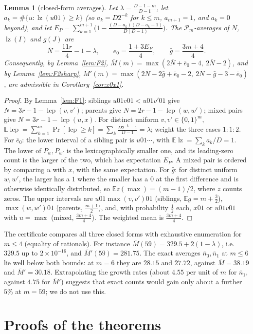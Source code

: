 \documentclass[11pt]{article}
\newtheorem{lemma}[theorem]{Lemma}
\theoremstyle{definition}
\theoremstyle{remark}
\newcommand{\E}{\mathbb{E}}
\newcommand{\lz}{\operatorname{lz}}
\newcommand{\lcp}{\operatorname{lcp}}
\begin{document}
\begin{lemma}[closed-form averages]\label{lem:avg}
Let $\lambda=\frac{D-1-m}{D-1}$, let $a_k=\#\{u:\lz(u01)\ge k\}$ (so $a_k=D2^{-k}$ for $k\le m$,
$a_{m+1}=1$, and $a_k=0$ beyond), and let
$E_P=\sum_{k=1}^{m+1}\bigl(1-\frac{(D-a_k)(D-a_k-1)}{D(D-1)}\bigr)$. The $\mathcal P_m$-averages of
$N$, $\lz(I)$ and $g(J)$ are
\[
 \bar N=\frac{11r}4-1-\lambda,\qquad \bar e_0=\frac{1+3E_P}4,\qquad \bar g=\frac{3m+4}4 .
\]
Consequently, by Lemma~\ref{lem:F2},
$\bar M(m)=\max(2\bar N+\bar e_0-4,\ 2\bar N-2)$, and by Lemma~\ref{lem:F2sharp},
$\bar M'(m)=\max(2\bar N-2\bar g+\bar e_0-2,\ 2\bar N-\bar g-3-\bar e_0)$, are admissible in
Corollary~\ref{cor:x0x1}.
\end{lemma}
\begin{proof}
By Lemma~\ref{lem:F1}: siblings $u01v01<u01v'01$ give $N=3r-1-\lcp(v,v')$; parents give
$N=2r-1-\lcp(w,w')$; mixed pairs give $N=3r-1-\lcp(u,x)$. For distinct uniform
$v,v'\in\{0,1\}^m$, $\E\lcp=\sum_{k=1}^m\Pr[\lcp\ge k]=\sum_k\frac{D2^{-k}-1}{D-1}=\lambda$; weight
the three cases $1:1:2$. For $\bar e_0$: the lower interval of a sibling pair is $u01\cdots$, with
$\E\lz=\sum_k a_k/D=1$. The lower of $P_w,P_{w'}$ is the lexicographically smaller one, and its
leading-zero count is the larger of the two, which has expectation $E_P$. A mixed pair is ordered
by comparing $u$ with $x$, with the same expectation. For $\bar g$: for distinct uniform
$w,w'$, the larger has a $1$ where the smaller has a $0$ at the first difference and is otherwise
identically distributed, so $\E z(\max)=(m-1)/2$, where $z$ counts zeros. The upper intervals are
$u01\max(v,v')01$ (siblings, $\E g=m+\frac32$), $\max(w,w')01$ (parents, $\frac{m+1}2$), and,
with probability $\frac12$ each, $x01$ or $u01v01$ with $u=\max$ (mixed, $\frac{3m+4}4$). The
weighted mean is $\frac{3m+4}4$.
\end{proof}

The certificate compares all three closed forms with exhaustive enumeration for $m\le4$ (equality
of rationals). For instance $\bar M(59)=329.5+2(1-\lambda)$, i.e.\ $329.5$ up to $2\times10^{-16}$, and
$\bar M'(59)=281.75$. The exact averages $\bar n_0,\bar n_1$ at $m\le6$ lie well below both
bounds: at $m=6$ they are $28.15$ and $27.72$, against $\bar M=38.19$ and $\bar M'=30.18$. Extrapolating the
growth rates (about $4.55$ per unit of $m$ for $\bar n_1$, against $4.75$ for $\bar M'$) suggests that
exact counts would gain only about a further $5\%$ at $m=59$; we do not use this.

\section{Proofs of the theorems}
\end{document}
